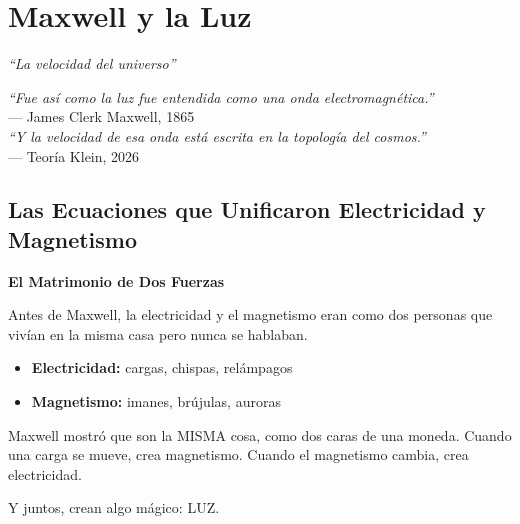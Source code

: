 \chapter{Maxwell y la Luz}
\label{cap:maxwell}

\begin{center}
\textit{``La velocidad del universo''}
\end{center}

\vspace{0.5cm}

\begin{tcolorbox}[colback=white, colframe=kleinblue, boxrule=2pt]
\centering
\textit{``Fue así como la luz fue entendida como una onda electromagnética.''}\\
--- James Clerk Maxwell, 1865\\[0.3cm]
\textit{``Y la velocidad de esa onda está escrita en la topología del cosmos.''}\\
--- Teoría Klein, 2026
\end{tcolorbox}


\section{Las Ecuaciones que Unificaron Electricidad y Magnetismo}

\begin{analogiabox}
\textbf{El Matrimonio de Dos Fuerzas}

Antes de Maxwell, la electricidad y el magnetismo eran como dos
personas que vivían en la misma casa pero nunca se hablaban.

\begin{itemize}
    \item \textbf{Electricidad:} cargas, chispas, relámpagos
    \item \textbf{Magnetismo:} imanes, brújulas, auroras
\end{itemize}

Maxwell mostró que son la MISMA cosa, como dos caras de una moneda.
Cuando una carga se mueve, crea magnetismo.
Cuando el magnetismo cambia, crea electricidad.

Y juntos, crean algo mágico: LUZ.
\end{analogiabox}


